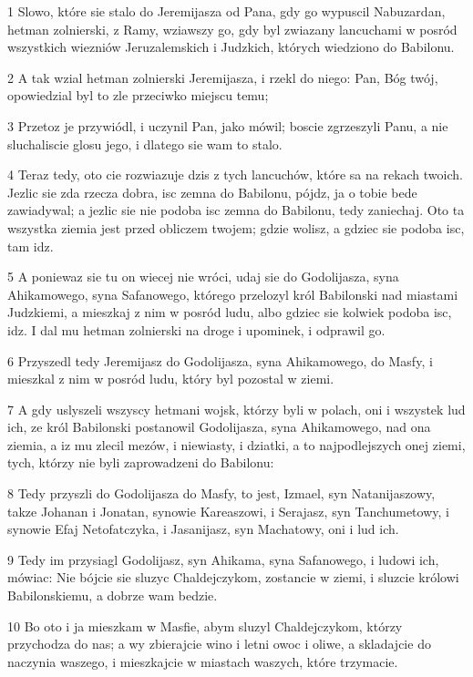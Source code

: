 \par 1 Slowo, które sie stalo do Jeremijasza od Pana, gdy go wypuscil Nabuzardan, hetman zolnierski, z Ramy, wziawszy go, gdy byl zwiazany lancuchami w posród wszystkich wiezniów Jeruzalemskich i Judzkich, których wiedziono do Babilonu.
\par 2 A tak wzial hetman zolnierski Jeremijasza, i rzekl do niego: Pan, Bóg twój, opowiedzial byl to zle przeciwko miejscu temu;
\par 3 Przetoz je przywiódl, i uczynil Pan, jako mówil; boscie zgrzeszyli Panu, a nie sluchaliscie glosu jego, i dlatego sie wam to stalo.
\par 4 Teraz tedy, oto cie rozwiazuje dzis z tych lancuchów, które sa na rekach twoich. Jezlic sie zda rzecza dobra, isc zemna do Babilonu, pójdz, ja o tobie bede zawiadywal; a jezlic sie nie podoba isc zemna do Babilonu, tedy zaniechaj. Oto ta wszystka ziemia jest przed obliczem twojem; gdzie wolisz, a gdziec sie podoba isc, tam idz.
\par 5 A poniewaz sie tu on wiecej nie wróci, udaj sie do Godolijasza, syna Ahikamowego, syna Safanowego, którego przelozyl król Babilonski nad miastami Judzkiemi, a mieszkaj z nim w posród ludu, albo gdziec sie kolwiek podoba isc, idz. I dal mu hetman zolnierski na droge i upominek, i odprawil go.
\par 6 Przyszedl tedy Jeremijasz do Godolijasza, syna Ahikamowego, do Masfy, i mieszkal z nim w posród ludu, który byl pozostal w ziemi.
\par 7 A gdy uslyszeli wszyscy hetmani wojsk, którzy byli w polach, oni i wszystek lud ich, ze król Babilonski postanowil Godolijasza, syna Ahikamowego, nad ona ziemia, a iz mu zlecil mezów, i niewiasty, i dziatki, a to najpodlejszych onej ziemi, tych, którzy nie byli zaprowadzeni do Babilonu:
\par 8 Tedy przyszli do Godolijasza do Masfy, to jest, Izmael, syn Natanijaszowy, takze Johanan i Jonatan, synowie Kareaszowi, i Serajasz, syn Tanchumetowy, i synowie Efaj Netofatczyka, i Jasanijasz, syn Machatowy, oni i lud ich.
\par 9 Tedy im przysiagl Godolijasz, syn Ahikama, syna Safanowego, i ludowi ich, mówiac: Nie bójcie sie sluzyc Chaldejczykom, zostancie w ziemi, i sluzcie królowi Babilonskiemu, a dobrze wam bedzie.
\par 10 Bo oto i ja mieszkam w Masfie, abym sluzyl Chaldejczykom, którzy przychodza do nas; a wy zbierajcie wino i letni owoc i oliwe, a skladajcie do naczynia waszego, i mieszkajcie w miastach waszych, które trzymacie.
